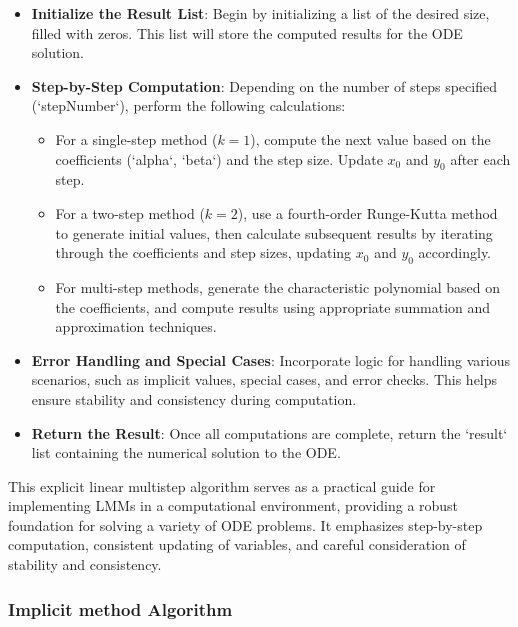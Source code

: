 \begin{itemize}
    \item \textbf{Initialize the Result List}: Begin by initializing a list of the desired size, filled with zeros. This list will store the computed results for the ODE solution.
    
    \item \textbf{Step-by-Step Computation}: Depending on the number of steps specified (`stepNumber`), perform the following calculations:
        \begin{itemize}
            \item For a single-step method (\(k = 1\)), compute the next value based on the coefficients (`alpha`, `beta`) and the step size. Update \(x_0\) and \(y_0\) after each step.
            \item For a two-step method (\(k = 2\)), use a fourth-order Runge-Kutta method to generate initial values, then calculate subsequent results by iterating through the coefficients and step sizes, updating \(x_0\) and \(y_0\) accordingly.
            \item For multi-step methods, generate the characteristic polynomial based on the coefficients, and compute results using appropriate summation and approximation techniques.
        \end{itemize}
    
    \item \textbf{Error Handling and Special Cases}: Incorporate logic for handling various scenarios, such as implicit values, special cases, and error checks. This helps ensure stability and consistency during computation.
    
    \item \textbf{Return the Result}: Once all computations are complete, return the `result` list containing the numerical solution to the ODE.
\end{itemize}

This explicit linear multistep algorithm serves as a practical guide for implementing LMMs in a computational environment, providing a robust foundation for solving a variety of ODE problems. It emphasizes step-by-step computation, consistent updating of variables, and careful consideration of stability and consistency.

 


\subsubsection{Implicit method Algorithm}